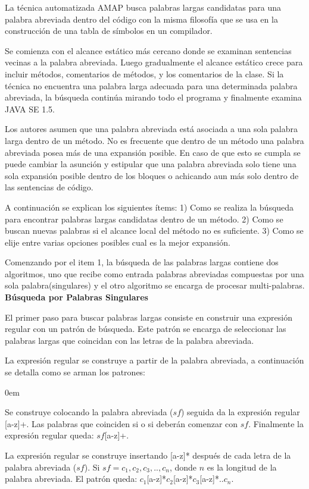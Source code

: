 \documentclass[a4paper,12pt]{report}
\begin{document}
La técnica automatizada AMAP busca palabras largas candidatas para una palabra abreviada dentro del código con la misma filosofía que se usa en la construcción de una tabla de símbolos en un compilador.

Se comienza con el alcance estático más cercano donde se examinan sentencias vecinas a la palabra abreviada. Luego gradualmente el alcance estático crece para incluir métodos, comentarios de métodos, y los comentarios de la clase. Si la técnica no encuentra una palabra larga adecuada para una determinada palabra abreviada, la búsqueda continúa mirando todo el programa y finalmente examina JAVA SE 1.5. 

Los autores asumen que una palabra abreviada está asociada a una sola palabra larga dentro de un método. No es frecuente que dentro de un método una palabra abreviada posea más de una expansión posible. En caso de que esto se cumpla se puede cambiar la asunción y estipular que una palabra abreviada solo tiene una sola expansión posible dentro de los bloques o achicando aun más solo dentro de las sentencias de código.

A continuación se explican los siguientes ítems: 1) Como se realiza la búsqueda para encontrar palabras largas candidatas dentro de un método. 2) Como se buscan nuevas palabras si el alcance local del método no es suficiente. 3) Como se elije entre varias opciones posibles cual es la mejor expansión.

Comenzando por el item 1, la búsqueda de las palabras largas contiene dos algoritmos, uno que recibe como entrada palabras abreviadas compuestas por una sola palabra(singulares) y el otro algoritmo se encarga de procesar multi-palabras.\\

\noindent \textbf{Búsqueda por Palabras Singulares\\}

El primer paso para buscar palabras largas consiste en construir una expresión regular con un patrón de búsqueda.  Este patrón se encarga de seleccionar las palabras largas que coincidan con las letras de la palabra abreviada.

La expresión regular se construye a partir de la palabra abreviada, a continuación se detalla como se arman los patrones: \\

\begin{description}
\itemsep0em%
\item[Patrón prefijo:] Se construye colocando la palabra abreviada ($sf$) seguida da la expresión regular [a-z]+. Las palabras que coinciden si o si deberán comenzar con $sf$. Finalmente la expresión regular queda: $sf$[a-z]+.

\item[Patrón compuesto por letras:]  La expresión regular se construye insertando [a-z]* después de cada letra de la palabra abreviada ($sf$). Si $sf=c_{1},c_{2},c_{3},..,c_{n}$, donde $n$ es la longitud de la palabra abreviada. El patrón queda: $c_{1}$[a-z]*$c_{2}$[a-z]*$c_{3}$[a-z]*..$c_{n}$.
\end{description}
\end{document}
